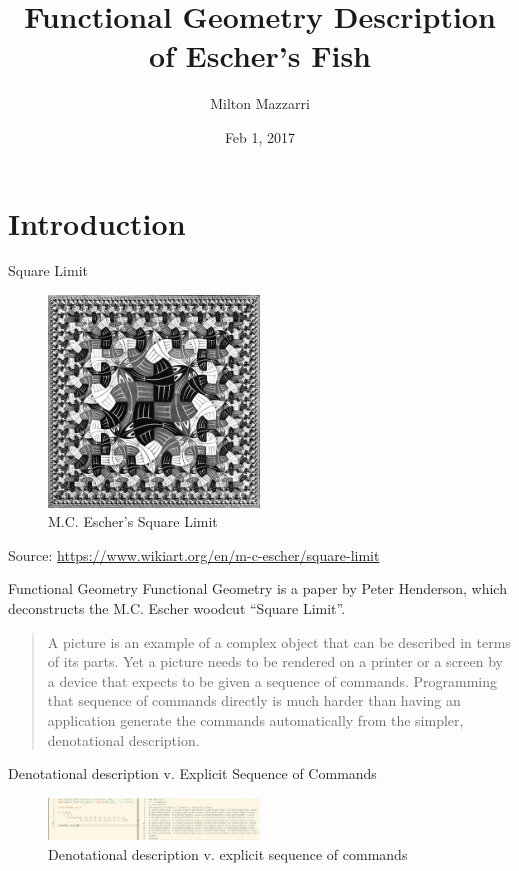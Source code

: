\documentclass{beamer}
\title{Functional Geometry Description of Escher's Fish}
\date{Feb 1, 2017}
\author{Milton Mazzarri}
\institute{Houston Elixir Meetup}
\begin{document}
    \maketitle

    \section{Introduction}

    \begin{frame}{Square Limit}

        \begin{figure}
           \centering
            \includegraphics[width=0.5\textwidth]{./figs/square-limit}
            \caption{M.C. Escher's Square Limit}
            \label{fig:square_limit}
        \end{figure}
        {\footnotesize Source: \url{https://www.wikiart.org/en/m-c-escher/square-limit}}
    \end{frame}

    \begin{frame}{Functional Geometry}
        Functional Geometry is a paper by Peter Henderson\cite{Henderson82,Henderson02}, which deconstructs the M.C. Escher woodcut ``Square Limit''.
        \begin{quote}
            A picture is an example of a complex object that can be described
            in terms of its parts. Yet a picture needs to be rendered on a
            printer or a screen by a device that expects to be given a sequence
            of commands. Programming that sequence of commands directly is much
            harder than having an application generate the commands
            automatically from the simpler, denotational description.
        \end{quote}
    \end{frame}

    \begin{frame}{Denotational description v. Explicit Sequence of Commands}
        \begin{figure}
            \centering
            \includegraphics[width=0.5\textwidth]{./figs/sequence-v-denotation}
            \caption{Denotational description v. explicit sequence of commands}
            \label{fig:sequence}
        \end{figure}
    \end{frame}
\end{document}
